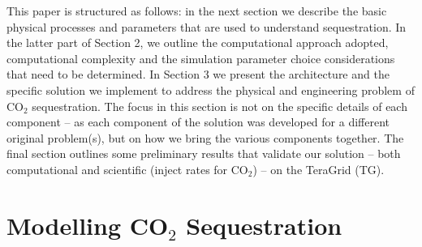 \documentclass{acm_proc_article-sp}
\newcommand{\jhanote}[1]{ {\textcolor{red} { ***Jha: #1 }}}
\newcommand{\yyenote}[1]{ {\textcolor{blue} { ***yye00: #1 }}}
\newcommand{\jhanote}[1]{}
\newcommand{\yyenote}[1]{}
\begin{document}
This paper is structured as follows: in the next section we describe the basic
physical processes and parameters that are used to understand
sequestration. In the latter part of Section 2, we outline the
computational approach adopted, computational complexity and the
simulation parameter choice considerations that need to be determined.
In Section 3 we present the architecture and the specific solution we
implement to address the physical and engineering problem of CO$_2$
sequestration. The focus in this section is not on the specific
details of each component -- as each component of the solution was
developed for a different original problem(s), but on how we bring the
various components together.  The final section outlines some
preliminary results that validate our solution -- both computational
and scientific (inject rates for CO$_2$) -- on the TeraGrid (TG).



\section{Modelling CO$_2$ Sequestration}


\end{document}
